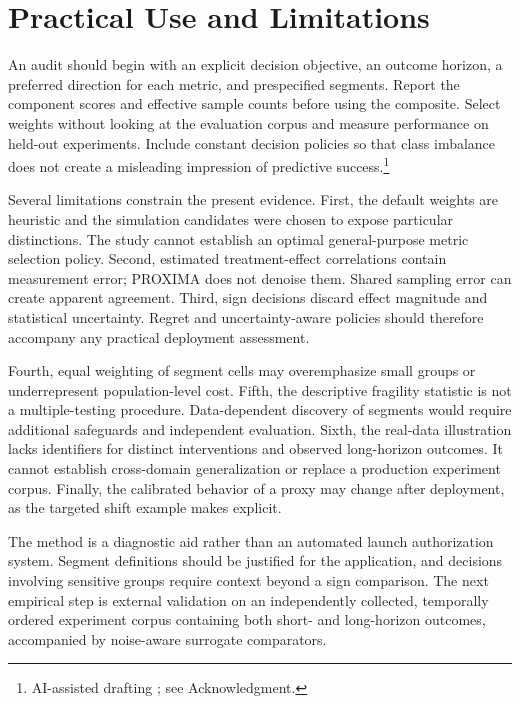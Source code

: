 \documentclass{ieeeaccess}
\begin{document}
\section{Practical Use and Limitations}
An audit should begin with an explicit decision objective, an outcome horizon, a preferred direction for each metric, and prespecified segments. Report the component scores and effective sample counts before using the composite. Select weights without looking at the evaluation corpus and measure performance on held-out experiments. Include constant decision policies so that class imbalance does not create a misleading impression of predictive success.\footnote{AI-assisted drafting \cite{codex}; see Acknowledgment.}

Several limitations constrain the present evidence. First, the default weights are heuristic and the simulation candidates were chosen to expose particular distinctions. The study cannot establish an optimal general-purpose metric selection policy. Second, estimated treatment-effect correlations contain measurement error; PROXIMA does not denoise them. Shared sampling error can create apparent agreement. Third, sign decisions discard effect magnitude and statistical uncertainty. Regret and uncertainty-aware policies should therefore accompany any practical deployment assessment.

Fourth, equal weighting of segment cells may overemphasize small groups or underrepresent population-level cost. Fifth, the descriptive fragility statistic is not a multiple-testing procedure. Data-dependent discovery of segments would require additional safeguards and independent evaluation. Sixth, the real-data illustration lacks identifiers for distinct interventions and observed long-horizon outcomes. It cannot establish cross-domain generalization or replace a production experiment corpus. Finally, the calibrated behavior of a proxy may change after deployment, as the targeted shift example makes explicit.

The method is a diagnostic aid rather than an automated launch authorization system. Segment definitions should be justified for the application, and decisions involving sensitive groups require context beyond a sign comparison. The next empirical step is external validation on an independently collected, temporally ordered experiment corpus containing both short- and long-horizon outcomes, accompanied by noise-aware surrogate comparators.
\end{document}
